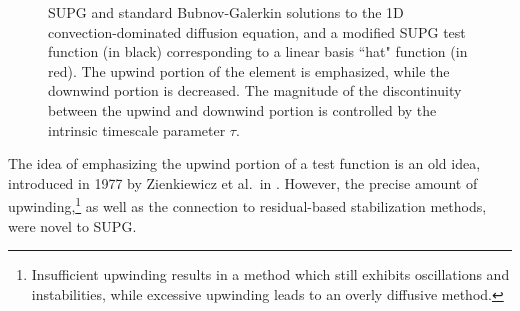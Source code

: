 \begin{figure}[!h]
\centering
{}
\caption{SUPG and standard Bubnov-Galerkin solutions to the 1D convection-dominated diffusion equation, and a modified SUPG test function (in black) corresponding to a linear basis ``hat" function (in red).  The upwind portion of the element is emphasized, while the downwind portion is decreased.  The magnitude of the discontinuity between the upwind and downwind portion is controlled by the intrinsic timescale parameter $\tau$. }
\label{fig:SUPG}
\end{figure}

The idea of emphasizing the upwind portion of a test function is an old idea, introduced in 1977 by Zienkiewicz et al.\ in \cite{zienkUpwind}.  However, the precise amount of upwinding,\footnote{Insufficient upwinding results in a method which still exhibits oscillations and instabilities, while excessive upwinding leads to an overly diffusive method.} as well as the connection to residual-based stabilization methods, were novel to SUPG.  

